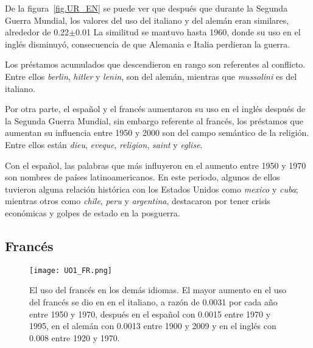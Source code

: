 De la figura~\ref{fig.UR_EN} se puede ver que después que durante la Segunda Guerra Mundial, los valores del uso del italiano y del alemán eran similares, alrededor de 0.22$\pm$0.01 La similitud se mantuvo hasta 1960, donde su uso en el inglés disminuyó, consecuencia de que Alemania e Italia perdieran la guerra.

Los préstamos acumulados que descendieron en rango son referentes al conflicto. Entre ellos \textit{berlin}, \textit{hitler} y \textit{lenin}, son del alemán,  mientras que \textit{mussolini} es del italiano. 

Por otra parte, el español y el francés aumentaron su uso en el inglés después de la Segunda Guerra Mundial, sin embargo  referente al francés, los préstamos que aumentan su influencia entre 1950 y 2000 son del campo semántico de la religión. Entre ellos están \textit{dieu}, \textit{eveque}, \textit{religion}, \textit{saint} y \textit{eglise}.

Con el español, las palabras que más influyeron en el aumento entre 1950 y 1970 son nombres de países latinoamericanos. En este periodo, algunos de ellos tuvieron alguna relación histórica con los Estados Unidos como \textit{mexico} y \textit{cuba}; mientras otros como \textit{chile}, \textit{peru} y \textit{argentina}, destacaron por tener crisis económicas y golpes de estado en la posguerra.  
\label{D-EN}


 





\subsection{Francés} %

\begin{figure}[h!]
	\centering
	\texttt{[image: UO1\_FR.png]}
	\caption{El uso del francés en los demás idiomas. El mayor aumento en el uso del francés se dio en en el italiano, a razón de 0.0031 por cada año entre 1950 y 1970, después en el español con 0.0015 entre 1970 y 1995, en el alemán con 0.0013 entre 1900 y 2009	 y en el inglés con 0.008 entre 1920 y 1970.}
	\label{fig.UO_FR}
\end{figure}

